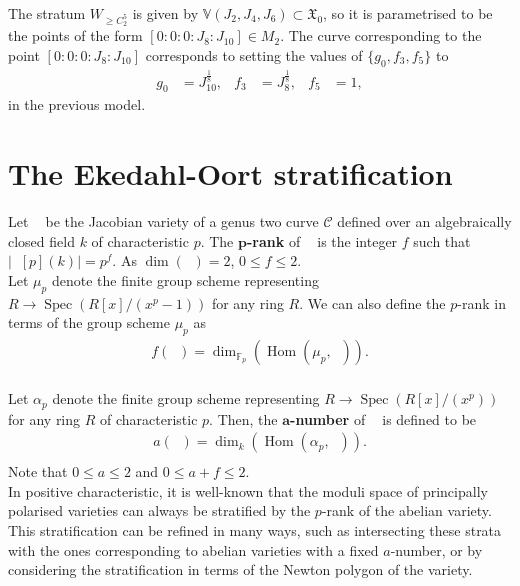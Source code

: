 \documentclass{amsart}
\newcommand{\calC}{\mathcal{C}}
\DeclareMathOperator{\Hom}{Hom}
\DeclareMathOperator{\Jac}{Jac}
\DeclareMathOperator{\Jacc}{\Jac(\mathcal{C})}
\DeclareMathOperator{\Spec}{Spec}
\numberwithin{equation}{section}
\theoremstyle{definition}
\theoremstyle{remark}
\begin{document}
The stratum $W_{\geq C_2^5}$ is given by $\mathbb{V}(J_2,J_4,J_6)\subset\mathfrak{X}_0$, so it is parametrised to be the points of the form $[0:0:0:J_8:J_{10}]\in M_2$. The curve corresponding to the point $[0:0:0:J_8:J_{10}]$ corresponds to setting the values of $\{g_0,f_3,f_5\}$ to
\begin{align*}
g_0&=J_{10}^{\tfrac{1}{8}}, & f_3&=J_{8}^{\tfrac{1}{8}}, &f_5&=1,
\end{align*}
in the previous model.\\


\section{The Ekedahl-Oort stratification} \label{EO_section}


Let $\Jacc$ be the Jacobian variety of a genus two curve $\calC$ defined over an algebraically closed field $k$ of characteristic $p$. The \textbf{$\boldsymbol{p}$-rank} of $\Jacc$ is the integer $f$ such that $\lvert \Jacc[p](k)\rvert=p^f$. As $\dim(\Jacc)=2$, $0\leq f\leq 2$.\\

Let $\mu_p$ denote the finite group scheme representing $R\rightarrow \Spec(R[x]/(x^p-1))$ for any ring $R$. We can also define the $p$-rank in terms of the group scheme $\mu_p$ as
\begin{align*}
f(\Jacc)=\dim_{\mathbb{F}_p}(\Hom(\mu_p,\Jacc)).\\
\end{align*}

Let $\alpha_p$ denote the finite group scheme representing $R\rightarrow \Spec(R[x]/(x^p))$ for any ring $R$ of characteristic $p$. Then, the \textbf{$\boldsymbol{a}$-number} of $\Jacc$ is defined to be
\begin{align*}
a(\Jacc)=\dim_k(\Hom(\alpha_p,\Jacc)).\\
\end{align*}
Note that $0\leq a\leq 2$ and $0\leq a+f\leq2$.\\


In positive characteristic, it is well-known that the moduli space of principally polarised varieties can always be stratified by the $p$-rank of the abelian variety. This stratification can be refined in many ways, such as intersecting these strata with the ones corresponding to abelian varieties with a fixed $a$-number, or by considering the stratification in terms of the Newton polygon of the variety.\\
\end{document}
